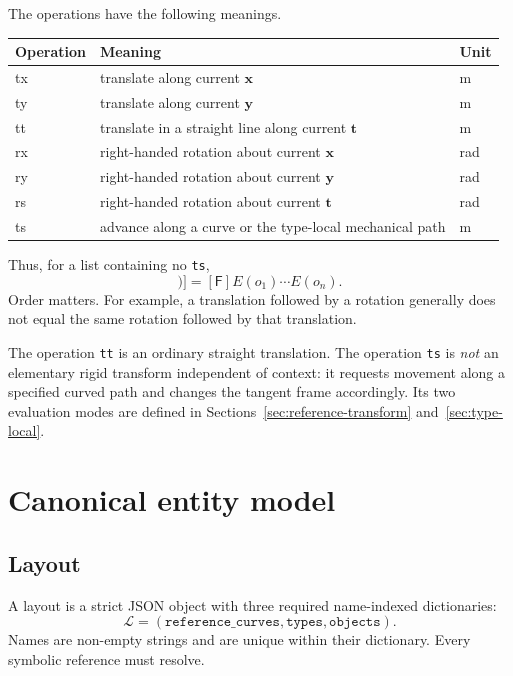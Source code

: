 \documentclass[11pt,a4paper]{article}
\newcommand{\Frame}{\mathsf{F}}
\newcommand{\Apply}{\operatorname{Apply}}
\begin{document}
The operations have the following meanings.

\begin{center}
\begin{tabular}{>{\ttfamily}l l l}
\toprule
\normalfont Operation & Meaning & Unit \\
\midrule
tx & translate along current $\mathbf{x}$ & m \\
ty & translate along current $\mathbf{y}$ & m \\
tt & translate in a straight line along current $\mathbf{t}$ & m \\
rx & right-handed rotation about current $\mathbf{x}$ & rad \\
ry & right-handed rotation about current $\mathbf{y}$ & rad \\
rs & right-handed rotation about current $\mathbf{t}$ & rad \\
ts & advance along a curve or the type-local mechanical path & m \\
\bottomrule
\end{tabular}
\end{center}

Thus, for a list containing no \texttt{ts},
\begin{equation}
 [\Apply(\Frame,[o_1,\ldots,o_n])]
 = [\Frame]E(o_1)\cdots E(o_n).
 \label{eq:ordered-ops}
\end{equation}
Order matters.  For example, a translation followed by a rotation generally
does not equal the same rotation followed by that translation.

The operation \texttt{tt} is an ordinary straight translation.  The operation
\texttt{ts} is \emph{not} an elementary rigid transform independent of context:
it requests movement along a specified curved path and changes the tangent
frame accordingly.  Its two evaluation modes are defined in
Sections~\ref{sec:reference-transform} and~\ref{sec:type-local}.

\section{Canonical entity model}

\subsection{Layout}

A layout is a strict JSON object with three required name-indexed dictionaries:
\begin{equation}
  \mathcal{L}=(\texttt{reference\_curves},\texttt{types},\texttt{objects}).
\end{equation}
Names are non-empty strings and are unique within their dictionary.  Every
symbolic reference must resolve.
\end{document}
